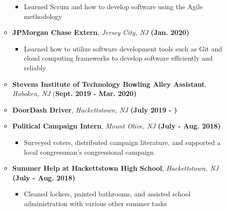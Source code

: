 \documentclass[11pt]{article}
\begin{document}
\begin{flushleft}
\begin{itemize}
\begin{itemize}
\begin{itemize}
                        \item Learned Scrum and how to develop software using the Agile methodology
                    \end{itemize}
                \item \textbf{JPMorgan Chase Extern}, \textit{Jersey City, NJ} \hfill{\textbf{(Jan. 2020)}}
                    \begin{itemize}
                        \item Learned how to utilize software development tools such as Git and cloud computing frameworks to develop software efficiently and reliably
                    \end{itemize}
                \item \textbf{Stevens Institute of Technology Bowling Alley Assistant}, \textit{Hoboken, NJ} \hfill{(\textbf{Sept. 2019 - Mar. 2020)}}
                \item \textbf{DoorDash Driver}, \textit{Hackettstown, NJ}	\hfill{\textbf{(July 2019 - )}}
                \item \textbf{Political Campaign Intern}, \textit{Mount Olive, NJ} \hfill{\textbf{(July - Aug. 2018)}}
                    \begin{itemize}
                        \item Surveyed voters, distributed campaign literature, and supported a local congressman's congressional campaign
                    \end{itemize}
                \item \textbf{Summer Help at Hackettstown High School}, \textit{Hackettstown, NJ}	\hfill{\textbf{(July - Aug. 2018)}}
                    \begin{itemize}
                        \item Cleaned lockers, painted bathrooms, and assisted school administration with various other summer tasks
                    \end{itemize}
            \end{itemize}
\end{itemize}

\end{flushleft}
\end{document}
